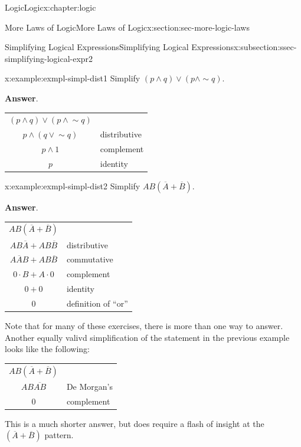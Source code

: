 \documentclass[twoside,10pt,]{book}
\newcommand{\blocktitlefont}{\relax}
\newcommand{\tabularfont}{\relax}
\numberwithin{equation}{section}
\begin{document}
\begin{chapterptx}{Logic}{}{Logic}{}{}{x:chapter:logic}
\begin{sectionptx}{More Laws of Logic}{}{More Laws of Logic}{}{}{x:section:sec-more-logic-laws}
\begin{subsectionptx}{Simplifying Logical Expressions}{}{Simplifying Logical Expressions}{}{}{x:subsection:ssec-simplifying-logical-expr2}
\begin{example}{}{x:example:exmpl-simpl-dist1}
Simplify \((p{\wedge}{}q){\vee}(p{\wedge}\sim\!{q})\).\par\smallskip%
\noindent\textbf{\blocktitlefont Answer}.\label{g:answer:idp28522712}{}\hypertarget{g:answer:idp28522712}{}\quad{}\begin{center}%
{\tabularfont%
\begin{tabular}{cc}
\((p{\wedge}{}q) {\vee}{}(p{\wedge}{}\sim\!{q}{})\)&\multicolumn{1}{l}{}\tabularnewline[0pt]
\(p{\wedge}{}(q{\vee}{}\sim\!{q}{}) \)&\multicolumn{1}{l}{distributive}\tabularnewline[0pt]
\(p{\wedge}{}1 \)&\multicolumn{1}{l}{complement}\tabularnewline[0pt]
\(p  \)&\multicolumn{1}{l}{identity}
\end{tabular}
}%
\end{center}%
\end{example}
\begin{example}{}{x:example:exmpl-simpl-dist2}%
Simplify \(AB(\overline{A}{} + \overline{B}{} )\).\par\smallskip%
\noindent\textbf{\blocktitlefont Answer}.\label{g:answer:idp28530136}{}\hypertarget{g:answer:idp28530136}{}\quad{}\begin{center}%
{\tabularfont%
\begin{tabular}{cc}
\(AB(\overline{A}{} +\overline{B}{})\)&\multicolumn{1}{l}{}\tabularnewline[0pt]
\(AB\overline{A}{}  + AB\overline{B}{}   \)&\multicolumn{1}{l}{distributive}\tabularnewline[0pt]
\(A\overline{A}{} B + AB\overline{B}{}  \)&\multicolumn{1}{l}{commutative}\tabularnewline[0pt]
\(0 \cdot B      + A\cdot 0  \)&\multicolumn{1}{l}{complement}\tabularnewline[0pt]
\(0        +       0    \)&\multicolumn{1}{l}{identity}\tabularnewline[0pt]
\(0            \)&\multicolumn{1}{l}{definition of ``or''}
\end{tabular}
}%
\end{center}%
\end{example}
Note that for many of these exercises, there is more than one way to answer.  Another equally valivd simplification of the statement in the previous example looks like the following: \begin{center}%
{\tabularfont%
\begin{tabular}{cc}
\(AB(\overline{A}{} +\overline{B}{})\)&\multicolumn{1}{l}{}\tabularnewline[0pt]
\(AB   \overline{AB} \)&\multicolumn{1}{l}{De Morgan's}\tabularnewline[0pt]
\(0 \)&\multicolumn{1}{l}{complement}
\end{tabular}
}%
\end{center}%
 This is a much shorter answer, but does require a flash of insight at the \((\overline{A} + \overline{B})\) pattern.%

\end{subsectionptx}
\end{sectionptx}
\end{chapterptx}
\end{document}
